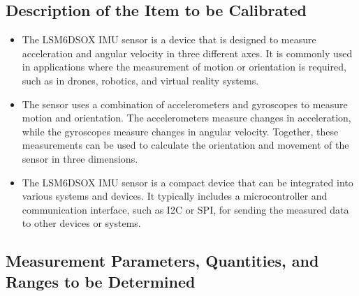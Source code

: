 \subsection{Description of the Item to be Calibrated}

\begin{itemize}
	\item The LSM6DSOX IMU sensor is a device that is designed to measure acceleration and angular velocity in three different axes. It is commonly used in applications where the measurement of motion or orientation is required, such as in drones, robotics, and virtual reality systems.
	\item The sensor uses a combination of accelerometers and gyroscopes to measure motion and orientation. The accelerometers measure changes in acceleration, while the gyroscopes measure changes in angular velocity. Together, these measurements can be used to calculate the orientation and movement of the sensor in three dimensions.
	\item The LSM6DSOX IMU sensor is a compact device that can be integrated into various systems and devices. It typically includes a microcontroller and communication interface, such as I2C or SPI, for sending the measured data to other devices or systems.
\end{itemize}

\subsection{Measurement Parameters, Quantities, and Ranges to be Determined}


